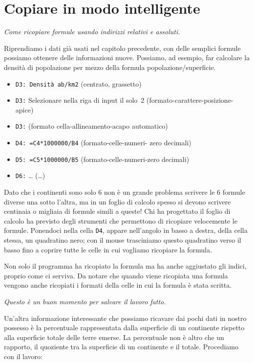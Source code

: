 \section{Copiare in modo intelligente}
\label{05_01_f_di_calc:copiare-in-modo-intelligente}

\emph{Come ricopiare formule usando indirizzi relativi e assoluti.}

Riprendiamo i dati già usati nel capitolo precedente, con delle semplici
formule possiamo ottenere delle informazioni nuove.
Possiamo, ad esempio, far calcolare la densità di popolazione per mezzo
della formula popolazione/superficie.

\begin{itemize} [noitemsep]
\item \texttt{D3: Densità ab/km2} 
(centrato, grassetto)
\item \texttt{D3:} Selezionare nella riga di input il solo~2 
(formato-carattere-posizione-apice)
\item \texttt{D3:} 
(formato cella-allineamento-acapo automatico)
\item \texttt{D4: =C4*1000000/B4}
(formato-celle-numeri- zero decimali)
\item \texttt{D5: =C5*1000000/B5}
(formato-celle-numeri-zero decimali)
\item \texttt{D6:} \dots
(\dots)
\end{itemize}

Dato che i continenti sono solo 6 non è un grande problema scrivere le 6
formule diverse una sotto l'altra, ma in un foglio di calcolo spesso si 
devono scrivere centinaia o migliaia di formule simili a queste!
Chi ha progettato il foglio di calcolo ha previsto degli strumenti che
permettono di ricopiare velocemente le formule.
Ponendoci nella cella \texttt{D4},
appare nell'angolo in basso a destra, della cella stessa, un quadratino nero;
con il mouse trasciniamo questo quadratino verso il basso fino a coprire
tutte le celle in cui vogliamo ricopiare la formula.

Non solo il programma ha ricopiato la formula ma ha anche aggiustato gli
indici, proprio come ci serviva.
Da notare che quando viene ricopiata una formula vengono anche ricopiati i
formati della celle in cui la formula è stata scritta.

\emph{Questo è un buon momento per salvare il lavoro fatto.}

Un'altra informazione interessante che possiamo ricavare dai pochi dati in
nostro possesso è la percentuale rappresentata dalla superficie di un
continente rispetto alla superficie totale delle terre emerse.
La percentuale non è altro che un rapporto, il quoziente tra la superficie
di un continente e il totale.
Procediamo con il lavoro:

